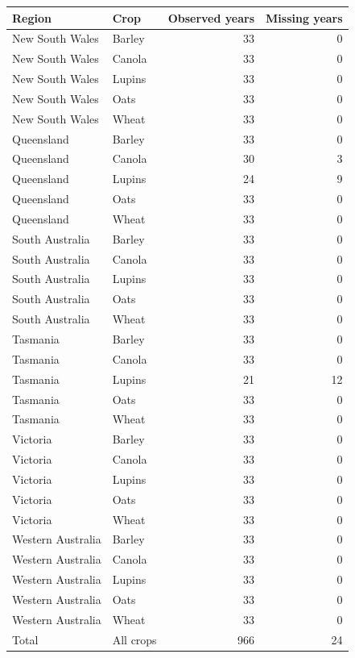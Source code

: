 \begin{tabular}{llrr}
\toprule
Region & Crop & Observed years & Missing years \\
\midrule
New South Wales & Barley & 33 & 0 \\
New South Wales & Canola & 33 & 0 \\
New South Wales & Lupins & 33 & 0 \\
New South Wales & Oats & 33 & 0 \\
New South Wales & Wheat & 33 & 0 \\
Queensland & Barley & 33 & 0 \\
Queensland & Canola & 30 & 3 \\
Queensland & Lupins & 24 & 9 \\
Queensland & Oats & 33 & 0 \\
Queensland & Wheat & 33 & 0 \\
South Australia & Barley & 33 & 0 \\
South Australia & Canola & 33 & 0 \\
South Australia & Lupins & 33 & 0 \\
South Australia & Oats & 33 & 0 \\
South Australia & Wheat & 33 & 0 \\
Tasmania & Barley & 33 & 0 \\
Tasmania & Canola & 33 & 0 \\
Tasmania & Lupins & 21 & 12 \\
Tasmania & Oats & 33 & 0 \\
Tasmania & Wheat & 33 & 0 \\
Victoria & Barley & 33 & 0 \\
Victoria & Canola & 33 & 0 \\
Victoria & Lupins & 33 & 0 \\
Victoria & Oats & 33 & 0 \\
Victoria & Wheat & 33 & 0 \\
Western Australia & Barley & 33 & 0 \\
Western Australia & Canola & 33 & 0 \\
Western Australia & Lupins & 33 & 0 \\
Western Australia & Oats & 33 & 0 \\
Western Australia & Wheat & 33 & 0 \\
Total & All crops & 966 & 24 \\
\bottomrule
\end{tabular}
